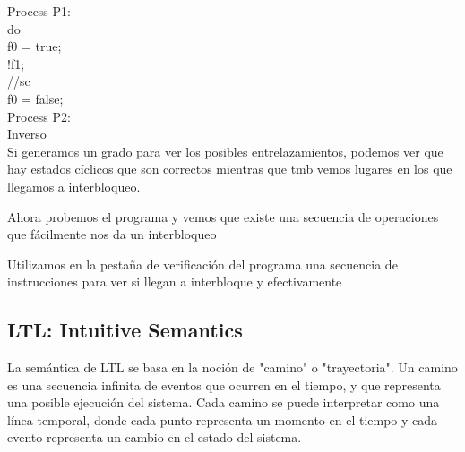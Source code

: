 Process P1: \\
 do\\
   f0 = true;\\
   !f1;       \\
   //sc       \\
   f0 = false;\\
        
Process P2: \\
  Inverso   \\
  \newline
Si generamos un grado para ver los posibles entrelazamientos, podemos ver que 
hay estados cíclicos que son correctos mientras que tmb vemos lugares en los que 
llegamos a interbloqueo.

Ahora probemos el programa y vemos que existe una secuencia de operaciones que 
fácilmente nos da un interbloqueo

Utilizamos en la pestaña de verificación del programa una secuencia de 
instrucciones para ver si llegan a interbloque y efectivamente 

\subsection{LTL: Intuitive Semantics }

La semántica de LTL se basa en la noción de "camino" o "trayectoria". 
Un camino es una secuencia infinita de eventos que ocurren en el tiempo, 
y que representa una posible ejecución del sistema. Cada camino se puede 
interpretar como una línea temporal, donde cada punto representa un momento 
en el tiempo y cada evento representa un cambio en el estado del sistema.




